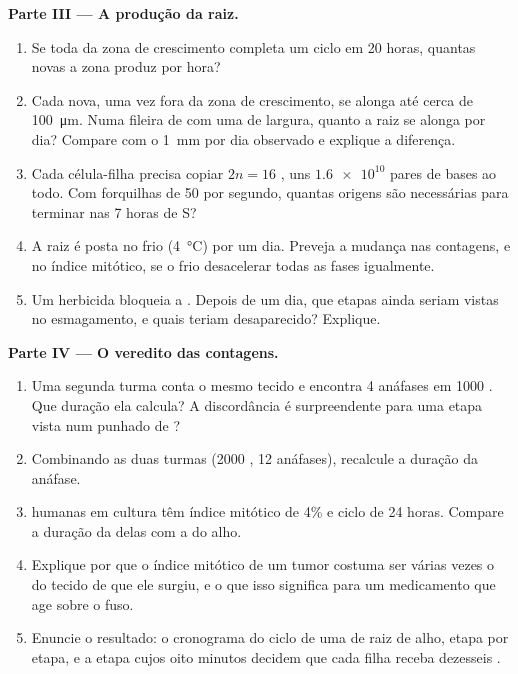 \begin{problem}
\medskip
\noindent\textbf{Parte III --- A produção da raiz.}
\begin{enumerate}[resume]
  \item Se toda  da zona de crescimento completa um ciclo em 20
        horas, quantas  novas a zona produz por hora?
  \item Cada  nova, uma vez fora da zona de crescimento, se
        alonga até cerca de \qty{100}{\micro m}. Numa fileira de
         com uma  de largura, quanto a raiz se alonga por
        dia? Compare com o \qty{1}{mm} por dia observado e explique a
        diferença.
  \item Cada célula-filha precisa copiar $2n = 16$ , uns
        $\num{1.6e10}$ pares de bases ao todo. Com forquilhas de 50
         por segundo, quantas origens são necessárias para
        terminar nas 7 horas de S?
  \item A raiz é posta no frio (\qty{4}{\celsius}) por um dia. Preveja
        a mudança nas contagens, e no índice mitótico, se o frio
        desacelerar todas as fases igualmente.
  \item Um herbicida bloqueia a . Depois de um dia, que
        etapas ainda seriam vistas no esmagamento, e quais teriam
        desaparecido? Explique.
\end{enumerate}

\medskip
\noindent\textbf{Parte IV --- O veredito das contagens.}
\begin{enumerate}[resume]
  \item Uma segunda turma conta o mesmo tecido e encontra 4 anáfases em
        1000 . Que duração ela calcula? A discordância é
        surpreendente para uma etapa vista num punhado de ?
  \item Combinando as duas turmas (2000 , 12 anáfases),
        recalcule a duração da anáfase.
  \item {} humanas em cultura têm índice mitótico de 4\% e ciclo
        de 24 horas. Compare a duração da  delas com a do alho.
  \item Explique por que o índice mitótico de um tumor costuma ser
        várias vezes o do tecido de que ele surgiu, e o que isso
        significa para um medicamento que age sobre o fuso.
  \item Enuncie o resultado: o cronograma do ciclo de uma  de
        raiz de alho, etapa por etapa, e a etapa cujos oito minutos
        decidem que cada filha receba dezesseis .
\end{enumerate}
\end{problem}
